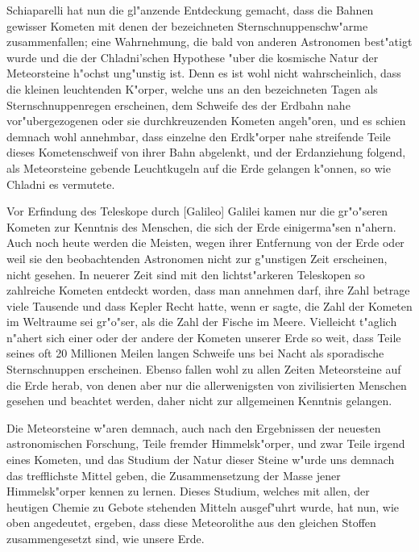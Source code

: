 \documentclass[a4paper, 11pt, oneside]{article}
\begin{document}
Schiaparelli hat nun die gl"anzende Entdeckung gemacht, dass die Bahnen gewisser Kometen mit denen der bezeichneten Sternschnuppenschw"arme zusammenfallen; eine Wahrnehmung, die bald von anderen Astronomen best"atigt wurde und die der Chladni'schen Hypothese "uber die kosmische Natur der Meteorsteine h"ochst ung"unstig ist. Denn es ist wohl nicht wahrscheinlich, dass die kleinen leuchtenden K"orper, welche uns an den bezeichneten Tagen als Sternschnuppenregen erscheinen, dem Schweife des der Erdbahn nahe vor"ubergezogenen oder sie durchkreuzenden Kometen angeh"oren, und es schien demnach wohl annehmbar, dass einzelne den Erdk"orper nahe streifende Teile dieses Kometenschweif von ihrer Bahn abgelenkt, und der Erdanziehung folgend, als Meteorsteine gebende Leuchtkugeln auf die Erde gelangen k"onnen, so wie Chladni es vermutete.

Vor Erfindung des Teleskope durch [Galileo] Galilei kamen nur die gr"o"seren Kometen zur Kenntnis des Menschen, die sich der Erde einigerma"sen n"ahern. Auch noch heute werden die Meisten, wegen ihrer Entfernung von der Erde oder weil sie den beobachtenden Astronomen nicht zur g"unstigen Zeit erscheinen, nicht gesehen. In neuerer Zeit sind mit den lichtst"arkeren Teleskopen so zahlreiche Kometen entdeckt worden, dass man annehmen darf, ihre Zahl betrage viele Tausende und dass Kepler Recht hatte, wenn er sagte, die Zahl der Kometen im Weltraume sei gr"o"ser, als die Zahl der Fische im Meere. Vielleicht t"aglich n"ahert sich einer oder der andere der Kometen unserer Erde so weit, dass Teile seines oft 20 Millionen Meilen langen Schweife uns bei Nacht als sporadische Sternschnuppen erscheinen. Ebenso fallen wohl zu allen Zeiten Meteorsteine auf die Erde herab, von denen aber nur die allerwenigsten von zivilisierten Menschen gesehen und beachtet werden, daher nicht zur allgemeinen Kenntnis gelangen.

Die Meteorsteine w"aren demnach, auch nach den Ergebnissen der neuesten astronomischen Forschung, Teile fremder Himmelsk"orper, und zwar Teile irgend eines Kometen, und das Studium der Natur dieser Steine w"urde uns demnach das trefflichste Mittel geben, die Zusammensetzung der Masse jener Himmelsk"orper kennen zu lernen. Dieses Studium, welches mit allen, der heutigen Chemie zu Gebote stehenden Mitteln ausgef"uhrt wurde, hat nun, wie oben angedeutet, ergeben, dass diese Meteorolithe aus den gleichen Stoffen zusammengesetzt sind, wie unsere Erde.
\end{document}
